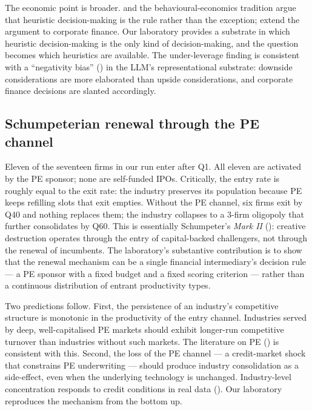 \documentclass[11pt]{article}
\begin{document}
The economic point is broader. \citet{kahneman2003maps} and the
behavioural-economics tradition argue that heuristic decision-making
is the rule rather than the exception; \citet{shefrinstatman1994}
extend the argument to corporate finance. Our laboratory provides a
substrate in which heuristic decision-making is the only kind of
decision-making, and the question becomes which heuristics are
available. The under-leverage finding is consistent with a
``negativity bias'' (\citealp{rozin2001negativity}) in the LLM's
representational substrate: downside considerations are more
elaborated than upside considerations, and corporate finance
decisions are slanted accordingly.

\subsection{Schumpeterian renewal through the PE channel}

Eleven of the seventeen firms in our run enter after Q1. All eleven
are activated by the PE sponsor; none are self-funded IPOs.
Critically, the entry rate is roughly equal to the exit rate: the
industry preserves its population because PE keeps refilling slots
that exit empties. Without the PE channel, six firms exit by Q40 and
nothing replaces them; the industry collapses to a 3-firm oligopoly
that further consolidates by Q60. This is essentially Schumpeter's
\textit{Mark II} (\citealp{schumpeter1942}): creative destruction
operates through the entry of capital-backed challengers, not
through the renewal of incumbents. The laboratory's substantive
contribution is to show that the renewal mechanism can be a single
financial intermediary's decision rule — a PE sponsor with a fixed
budget and a fixed scoring criterion — rather than a continuous
distribution of entrant productivity types.

Two predictions follow. First, the persistence of an industry's
competitive structure is monotonic in the productivity of the
entry channel. Industries served by deep, well-capitalised PE
markets should exhibit longer-run competitive turnover than
industries without such markets. The literature on PE
(\citealp{kaplan2009leveraged}) is consistent with this. Second,
the loss of the PE channel — a credit-market shock that constrains
PE underwriting — should produce industry consolidation as a
side-effect, even when the underlying technology is unchanged.
Industry-level concentration responds to credit conditions in real
data (\citealp{erel2012capital}). Our laboratory reproduces the
mechanism from the bottom up.
\end{document}
